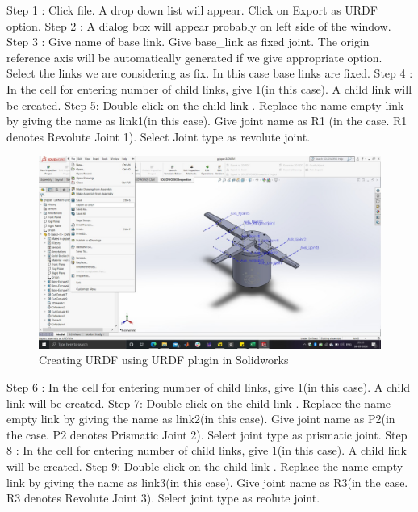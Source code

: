 \documentclass[a4paper,12pt,one side]{report}%
\begin{document}
Step 1 : Click file. A drop down list will appear. Click on Export as URDF option. \newline
Step 2 : A dialog box will appear probably on left side of the window. \newline
Step 3 : Give name of base link. Give base\_link as fixed joint. The origin reference axis will be automatically generated if we give appropriate option. Select the links we are considering as fix. In this case base links are fixed.\newline
Step 4 : In the cell for entering number of child links, give 1(in this case). A child link will be created.\newline
Step 5: Double click on the child link . Replace the name empty link by giving the name as link1(in this case). Give joint name as R1 (in the case. R1 denotes Revolute Joint 1).  Select Joint type as revolute joint.\newline
\begin{figure}
    \centering
    \includegraphics[scale=0.3]{gripper_images/Create_URDF.jpeg}
    \caption{Creating URDF using URDF plugin in Solidworks}
    \label{fig:my_label}
\end{figure}
Step 6 : In the cell for entering number of child links, give 1(in this case). A child link will be created.\newline
Step 7: Double click on the child link . Replace the name empty link by giving the name as link2(in this case). Give joint name as P2(in the case. P2 denotes Prismatic Joint 2). Select joint type as prismatic joint.\newline
Step 8 : In the cell for entering number of child links, give 1(in this case). A child link will be created.\newline
Step 9: Double click on the child link . Replace the name empty link by giving the name as link3(in this case). Give joint name as R3(in the case. R3 denotes Revolute Joint 3). Select joint type as reolute joint. \newline
\end{document}
